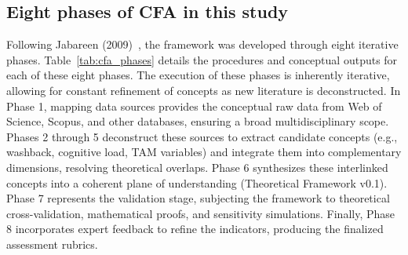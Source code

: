 \documentclass[11pt,a4paper]{article}
\begin{document}
\subsection{Eight phases of CFA in this study}

Following Jabareen (2009)~\cite{b6}, the framework was developed through eight iterative phases. Table~\ref{tab:cfa_phases} details the procedures and conceptual outputs for each of these eight phases. The execution of these phases is inherently iterative, allowing for constant refinement of concepts as new literature is deconstructed. In Phase 1, mapping data sources provides the conceptual raw data from Web of Science, Scopus, and other databases, ensuring a broad multidisciplinary scope. Phases 2 through 5 deconstruct these sources to extract candidate concepts (e.g., washback, cognitive load, TAM variables) and integrate them into complementary dimensions, resolving theoretical overlaps. Phase 6 synthesizes these interlinked concepts into a coherent plane of understanding (Theoretical Framework v0.1). Phase 7 represents the validation stage, subjecting the framework to theoretical cross-validation, mathematical proofs, and sensitivity simulations. Finally, Phase 8 incorporates expert feedback to refine the indicators, producing the finalized assessment rubrics.
\end{document}
